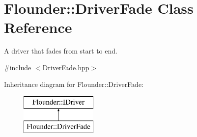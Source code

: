 \hypertarget{class_flounder_1_1_driver_fade}{}\section{Flounder\+:\+:Driver\+Fade Class Reference}
\label{class_flounder_1_1_driver_fade}


A driver that fades from start to end.  




{\ttfamily \#include $<$Driver\+Fade.\+hpp$>$}

Inheritance diagram for Flounder\+:\+:Driver\+Fade\+:\begin{figure}[H]
\begin{center}
\leavevmode
\includegraphics[height=2.000000cm]{class_flounder_1_1_driver_fade}
\end{center}
\end{figure}
